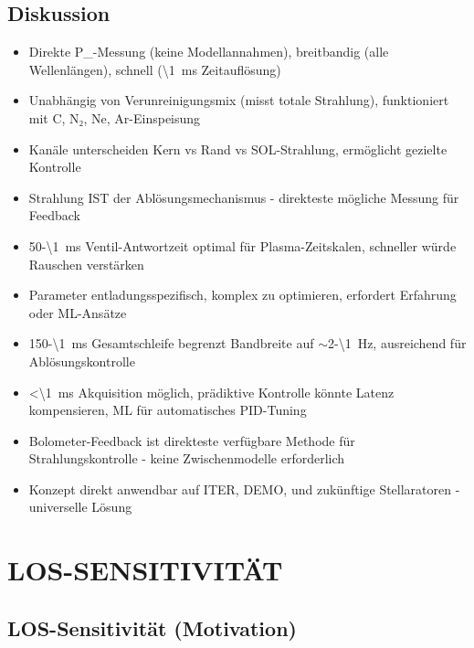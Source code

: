 \documentclass[11pt,a4paper]{article}
\begin{document}
\subsection{Diskussion}

\begin{itemize}
\item \textbf{\1} Direkte P_{}-Messung (keine Modellannahmen), breitbandig (alle Wellenlängen), schnell (\SI{\1}{m}s Zeitauflösung)
\item \textbf{\1} Unabhängig von Verunreinigungsmix (misst totale Strahlung), funktioniert mit C, N₂, Ne, Ar-Einspeisung
\item \textbf{\1} Kanäle unterscheiden Kern vs Rand vs SOL-Strahlung, ermöglicht gezielte Kontrolle
\item \textbf{\1} Strahlung IST der Ablösungsmechanismus - direkteste mögliche Messung für Feedback
\item \textbf{\1} 50-\SI{\1}{m}s Ventil-Antwortzeit optimal für Plasma-Zeitskalen, schneller würde Rauschen verstärken
\item \textbf{\1} Parameter entladungsspezifisch, komplex zu optimieren, erfordert Erfahrung oder ML-Ansätze
\item \textbf{\1} 150-\SI{\1}{m}s Gesamtschleife begrenzt Bandbreite auf $\sim$2-\SI{\1}{Hz}, ausreichend für Ablösungskontrolle
\item \textbf{\1} <\SI{\1}{m}s Akquisition möglich, prädiktive Kontrolle könnte Latenz kompensieren, ML für automatisches PID-Tuning
\item \textbf{\1} Bolometer-Feedback ist direkteste verfügbare Methode für Strahlungskontrolle - keine Zwischenmodelle erforderlich
\item \textbf{\1} Konzept direkt anwendbar auf ITER, DEMO, und zukünftige Stellaratoren - universelle Lösung
\end{itemize}

\section{LOS-SENSITIVITÄT}

\subsection{LOS-Sensitivität (Motivation)}
\end{document}
